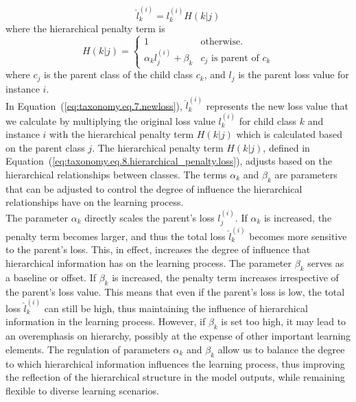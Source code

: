 \begin{equation}
    \label{eq:taxonomy.eq.7.newloss}
    \widehat{l}_k^{(i)} = l_k^{(i)} H( k \vert j)
\end{equation}
where the hierarchical penalty term is
\begin{equation}
    \label{eq:taxonomy.eq.8.hierarchical_penalty.loss}
    H(k \vert j) =
    \left\{ \begin{array}{ll}
    1 & \text{otherwise.}
    \\
    \alpha_k l_j^{(i)} + \beta_k & c_j \text{ is parent of } c_k
    \end{array} \right.
\end{equation}
where $c_j$ is the parent class of the child class $c_k$, and $l_j$ is the parent loss value for instance $i$. \\

In Equation~(\ref{eq:taxonomy.eq.7.newloss}), $\widehat{l}_k^{(i)}$ represents the new loss value that we calculate by multiplying the original loss value $l_k^{(i)}$ for child class $k$ and instance $i$ with the hierarchical penalty term $H(k \vert j)$ which is calculated based on the parent class $j$. The hierarchical penalty term $H(k \vert j)$, defined in Equation~(\ref{eq:taxonomy.eq.8.hierarchical_penalty.loss}), adjusts based on the hierarchical relationships between classes. The terms $\alpha _k$ and $\beta_k$ are parameters that can be adjusted to control the degree of influence the hierarchical relationships have on the learning process.
\\ %
The parameter $\alpha _k$ directly scales the parent's loss $l_j^{(i)}$. If $\alpha _k$ is increased, the penalty term becomes larger, and thus the total loss $\widehat{l}_k^{(i)}$ becomes more sensitive to the parent's loss. This, in effect, increases the degree of influence that hierarchical information has on the learning process. The parameter $\beta_k$ serves as a baseline or offset. If $\beta_k$ is increased, the penalty term increases irrespective of the parent's loss value. This means that even if the parent's loss is low, the total loss $\widehat{l}_k^{(i)}$ can still be high, thus maintaining the influence of hierarchical information in the learning process. However, if $\beta_k$ is set too high, it may lead to an overemphasis on hierarchy, possibly at the expense of other important learning elements. The regulation of parameters $\alpha_k$ and $\beta_k$ allow us to balance the degree to which hierarchical information influences the learning process, thus improving the reflection of the hierarchical structure in the model outputs, while remaining flexible to diverse learning scenarios.
%
